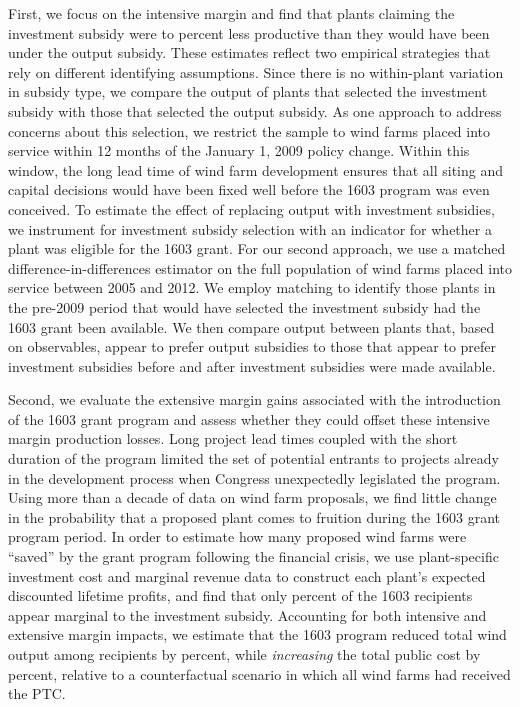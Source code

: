 \documentclass[12pt]{article}
\begin{document}
First, we focus on the intensive margin and find that plants claiming the investment subsidy were  \unskip to percent less productive than they would have been under the output subsidy. These estimates reflect two empirical strategies that rely on different identifying assumptions. Since there is no within-plant variation in subsidy type, we compare the output of plants that selected the investment subsidy with those that selected the output subsidy. As one approach to address concerns about this selection, we restrict the sample to wind farms placed into service within 12 months of the January 1, 2009 policy change. Within this window, the long lead time of wind farm development ensures that all siting and capital decisions would have been fixed well before the 1603 program was even conceived. To estimate the effect of replacing output with investment subsidies, we instrument for investment subsidy selection with an indicator for whether a plant was eligible for the 1603 grant. For our second approach, we use a matched difference-in-differences estimator on the full population of wind farms placed into service between 2005 and 2012. We employ matching to identify those plants in the pre-2009 period that would have selected the investment subsidy had the 1603 grant been available. We then compare output between plants that, based on observables, appear to prefer output subsidies to those that appear to prefer investment subsidies before and after investment subsidies were made available.

Second, we evaluate the extensive margin gains associated with the introduction of the 1603 grant program and assess whether they could offset these intensive margin production losses. Long project lead times coupled with the short duration of the program limited the set of potential entrants to projects already in the development process when Congress unexpectedly legislated the program. Using more than a decade of data on wind farm proposals, we find little change in the probability that a proposed plant comes to fruition during the 1603 grant program period. In order to estimate how many proposed wind farms were ``saved'' by the grant program following the financial crisis, we use plant-specific investment cost and marginal revenue data to construct each plant's expected discounted lifetime profits, and find that only  \unskip percent of the 1603 recipients appear marginal to the investment subsidy. Accounting for both intensive and extensive margin impacts, we estimate that the 1603 program reduced total wind output among recipients by  \unskip percent, while \emph{increasing} the total public cost by  \unskip percent, relative to a counterfactual scenario in which all wind farms had received the PTC.
\end{document}
